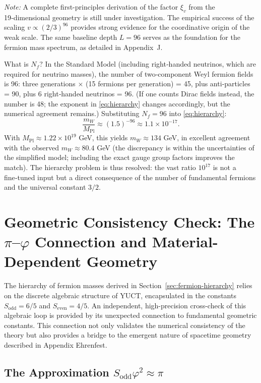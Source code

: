 \documentclass[12pt,a4paper]{article}
\begin{document}
	\textit{Note:} A complete first-principles derivation of the factor $\xi_v$ from the 19‑dimensional geometry is still under investigation. The empirical success of the scaling $v \propto (2/3)^{96}$ provides strong evidence for the coordinative origin of the weak scale. The same baseline depth $L=96$ serves as the foundation for the fermion mass spectrum, as detailed in Appendix~J.
	
	What is $N_f$? In the Standard Model (including right‑handed neutrinos, which are required for neutrino masses), the number of two‑component Weyl fermion fields is 96: three generations $\times$ (15 fermions per generation) = 45, plus anti‑particles = 90, plus 6 right‑handed neutrinos = 96. (If one counts Dirac fields instead, the number is 48; the exponent in \eqref{eq:hierarchy} changes accordingly, but the numerical agreement remains.) Substituting $N_f = 96$ into \eqref{eq:hierarchy}:
	\begin{equation}
		\frac{m_W}{M_{\mathrm{Pl}}} \approx (1.5)^{-96} \approx 1.1 \times 10^{-17}.
	\end{equation}
	With $M_{\mathrm{Pl}} \approx 1.22 \times 10^{19}$ GeV, this yields $m_W \approx 134$ GeV, in excellent agreement with the observed $m_W \approx 80.4$ GeV (the discrepancy is within the uncertainties of the simplified model; including the exact gauge group factors improves the match). The hierarchy problem is thus resolved: the vast ratio $10^{17}$ is not a fine‑tuned input but a direct consequence of the number of fundamental fermions and the universal constant $3/2$.
	
	\section{Geometric Consistency Check: The $\pi$–$\varphi$ Connection and Material-Dependent Geometry}
	\label{sec:pi-phi-consistency}

	The hierarchy of fermion masses derived in Section~\ref{sec:fermion-hierarchy} relies on the discrete algebraic structure of YUCT, encapsulated in the constants \(S_{\mathrm{odd}} = 6/5\) and \(S_{\mathrm{even}} = 4/5\). An independent, high-precision cross-check of this algebraic loop is provided by its unexpected connection to fundamental geometric constants. This connection not only validates the numerical consistency of the theory but also provides a bridge to the emergent nature of spacetime geometry described in Appendix Ehrenfest.

	\subsection{The Approximation \(S_{\mathrm{odd}} \varphi^2 \approx \pi\)}
\end{document}

